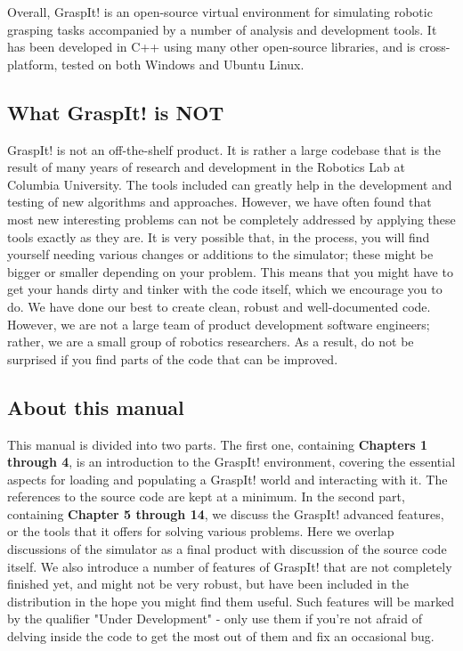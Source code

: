 Overall, GraspIt! is an open-source virtual environment for simulating
robotic grasping tasks accompanied by a number of analysis and
development tools. It has been developed in C++ using many other
open-source libraries, and is cross-platform, tested on both Windows
and Ubuntu Linux.

\subsection{What GraspIt! is NOT}

GraspIt! is not an off-the-shelf product. It is rather a large
codebase that is the result of many years of research and development
in the Robotics Lab at Columbia University. The tools included can
greatly help in the development and testing of new algorithms and
approaches. However, we have often found that most new interesting
problems can not be completely addressed by applying these tools
exactly as they are. It is very possible that, in the process, you
will find yourself needing various changes or additions to the
simulator; these might be bigger or smaller depending on your
problem. This means that you might have to get your hands dirty and
tinker with the code itself, which we encourage you to do. We have
done our best to create clean, robust and well-documented
code. However, we are not a large team of product development software
engineers; rather, we are a small group of robotics researchers. As a
result, do not be surprised if you find parts of the code that can be
improved.

\subsection{About this manual}

This manual is divided into two parts. The first one, containing
\textbf{Chapters 1 through 4}, is an introduction to the GraspIt!
environment, covering the essential aspects for loading and populating
a GraspIt!  world and interacting with it. The references to the
source code are kept at a minimum. In the second part, containing
\textbf{Chapter 5 through 14}, we discuss the GraspIt! advanced
features, or the tools that it offers for solving various
problems. Here we overlap discussions of the simulator as a final
product with discussion of the source code itself. We also introduce a
number of features of GraspIt!  that are not completely finished yet,
and might not be very robust, but have been included in the
distribution in the hope you might find them useful. Such features
will be marked by the qualifier "Under Development" - only use them if
you're not afraid of delving inside the code to get the most out of
them and fix an occasional bug.

